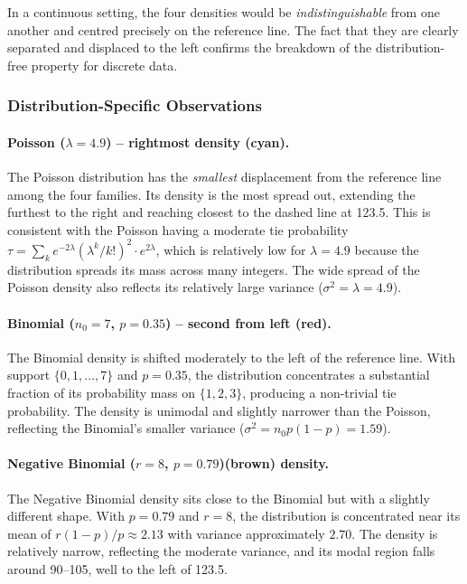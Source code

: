 \documentclass[10pt]{article}
\begin{document}
In a continuous setting, the four densities would be
\emph{indistinguishable} from one another and centred precisely on
the reference line. The fact that they are clearly separated and
displaced to the left confirms the breakdown of the distribution-free
property for discrete data.

\subsubsection{Distribution-Specific Observations}

\paragraph{Poisson ($\lambda = 4.9$) -- rightmost density (cyan).}
The Poisson distribution has the \emph{smallest} displacement
from the reference line among the four families. Its density is
the most spread out, extending the furthest to the right and
reaching closest to the dashed line at 123.5. This is consistent
with the Poisson having a moderate tie probability
$\tau = \sum_k e^{-2\lambda}(\lambda^k/k!)^2 \cdot e^{2\lambda}$,
which is relatively low for $\lambda = 4.9$ because the
distribution spreads its mass across many integers. The wide spread
of the Poisson density also reflects its relatively large variance
($\sigma^2 = \lambda = 4.9$).

\paragraph{Binomial ($n_0 = 7$, $p = 0.35$) -- second from left (red).}
The Binomial density is shifted moderately to the left of the
reference line. With support $\{0, 1, \ldots, 7\}$ and
$p = 0.35$, the distribution concentrates a substantial fraction
of its probability mass on $\{1, 2, 3\}$, producing a non-trivial
tie probability. The density is unimodal and slightly narrower than
the Poisson, reflecting the Binomial's smaller variance
($\sigma^2 = n_0 p(1-p) = 1.59$).

\paragraph{Negative Binomial ($r = 8$, $p = 0.79$)(brown) density.}
The Negative Binomial density sits close to the Binomial but with
a slightly different shape. With $p = 0.79$ and $r = 8$, the
distribution is concentrated near its mean of $r(1-p)/p \approx
2.13$ with variance approximately $2.70$. The density is relatively
narrow, reflecting the moderate variance, and its modal region falls
around 90--105, well to the left of 123.5.
\end{document}
